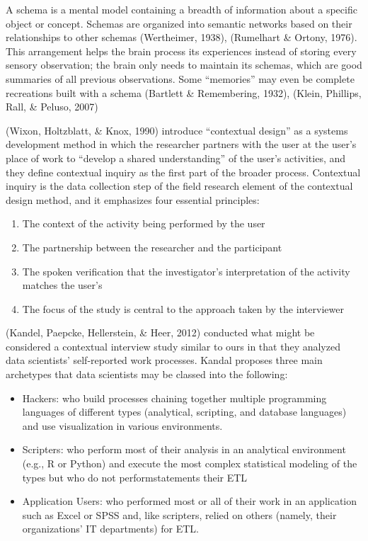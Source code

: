 \documentclass[print]{nuthesis}
\providecommand{\tightlist}{%
  \setlength{\itemsep}{0pt}\setlength{\parskip}{0pt}}
\begin{document}
A schema is a mental model containing a breadth of information about a specific object or concept. Schemas are organized into semantic networks based on their relationships to other schemas (Wertheimer, 1938), (Rumelhart \& Ortony, 1976). This arrangement helps the brain process its experiences instead of storing every sensory observation; the brain only needs to maintain its schemas, which are good summaries of all previous observations. Some ``memories'' may even be complete recreations built with a schema (Bartlett \& Remembering, 1932), (Klein, Phillips, Rall, \& Peluso, 2007)

(Wixon, Holtzblatt, \& Knox, 1990) introduce ``contextual design'' as a systems development method in which the researcher partners with the user at the user's place of work to ``develop a shared understanding'' of the user's activities, and they define contextual inquiry as the first part of the broader process. Contextual inquiry is the data collection step of the field research element of the contextual design method, and it emphasizes four essential principles:

\begin{enumerate}
\def\labelenumi{\arabic{enumi}.}
\tightlist
\item
  The context of the activity being performed by the user
\item
  The partnership between the researcher and the participant
\item
  The spoken verification that the investigator's interpretation of the activity matches the user's
\item
  The focus of the study is central to the approach taken by the interviewer
\end{enumerate}

(Kandel, Paepcke, Hellerstein, \& Heer, 2012) conducted what might be considered a contextual interview study similar to ours in that they analyzed data scientists' self-reported work processes. Kandal proposes three main archetypes that data scientists may be classed into the following:

\begin{itemize}
\tightlist
\item
  Hackers: who build processes chaining together multiple programming languages of different types (analytical, scripting, and database languages) and use visualization in various environments.
\item
  Scripters: who perform most of their analysis in an analytical environment (e.g., R or Python) and execute the most complex statistical modeling of the types but who do not performstatements their ETL
\item
  Application Users: who performed most or all of their work in an application such as Excel or SPSS and, like scripters, relied on others (namely, their organizations' IT departments) for ETL.
\end{itemize}
\end{document}
